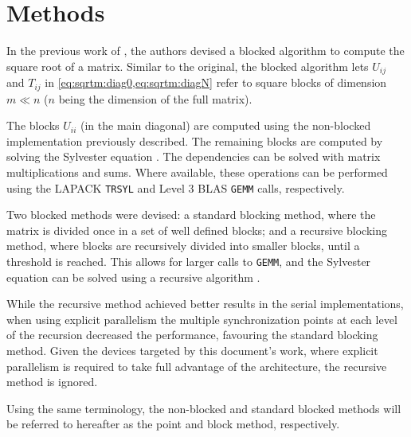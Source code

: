 \documentclass[../thesis]{subfiles}
\begin{document}
	\section{Methods}

		In the previous work of \citeauthor{Deadman:Higham:Ralha:2013}\xspace\cite{Deadman:Higham:Ralha:2013}, the authors devised a blocked algorithm to compute the square root of a matrix. Similar to the original, the blocked algorithm lets $U_{ij}$ and $T_{ij}$ in \cref{eq:sqrtm:diag0,eq:sqrtm:diagN} refer to square blocks of dimension $m \ll n$ ($n$ being the dimension of the full matrix).

		The blocks $U_{ii}$ (in the main diagonal) are computed using the non-blocked implementation previously described.
		The remaining blocks are computed by solving the Sylvester equation .
		The dependencies can be solved with matrix multiplications and sums.
		Where available, these operations can be performed using the LAPACK \texttt{TRSYL} and Level 3 BLAS \texttt{GEMM} calls, respectively.

		Two blocked methods were devised: a standard blocking method, where the matrix is divided once in a set of well defined blocks; and a recursive blocking method, where blocks are recursively divided into smaller blocks, until a threshold is reached. This allows for larger calls to \texttt{GEMM}, and the Sylvester equation can be solved using a recursive algorithm \cite{Jonsson:Kagstrom:2002}.

		While the recursive method achieved better results in the serial implementations, when using explicit parallelism the multiple synchronization points at each level of the recursion decreased the performance, favouring the standard blocking method. Given the devices targeted by this document's work, where explicit parallelism is required to take full advantage of the architecture, the recursive method is ignored.

		Using the same terminology, the non-blocked and standard blocked methods will be referred to hereafter as the point and block method, respectively.

		
\end{document}
